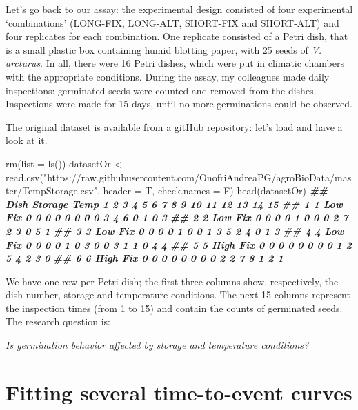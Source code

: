 \documentclass[
]{book}
\newenvironment{Shaded}{\begin{snugshade}}{\end{snugshade}}
\newcommand{\AttributeTok}[1]{\textcolor[rgb]{0.77,0.63,0.00}{#1}}
\newcommand{\DocumentationTok}[1]{\textcolor[rgb]{0.56,0.35,0.01}{\textbf{\textit{#1}}}}
\newcommand{\FunctionTok}[1]{\textcolor[rgb]{0.00,0.00,0.00}{#1}}
\newcommand{\NormalTok}[1]{#1}
\newcommand{\OtherTok}[1]{\textcolor[rgb]{0.56,0.35,0.01}{#1}}
\newcommand{\StringTok}[1]{\textcolor[rgb]{0.31,0.60,0.02}{#1}}
\begin{document}
Let's go back to our assay: the experimental design consisted of four experimental `combinations' (LONG-FIX, LONG-ALT, SHORT-FIX and SHORT-ALT) and four replicates for each combination. One replicate consisted of a Petri dish, that is a small plastic box containing humid blotting paper, with 25 seeds of \emph{V. arcturus}. In all, there were 16 Petri dishes, which were put in climatic chambers with the appropriate conditions. During the assay, my colleagues made daily inspections: germinated seeds were counted and removed from the dishes. Inspections were made for 15 days, until no more germinations could be observed.

The original dataset is available from a gitHub repository: let's load and have a look at it.

\begin{Shaded}
\begin{Highlighting}[]
\FunctionTok{rm}\NormalTok{(}\AttributeTok{list =} \FunctionTok{ls}\NormalTok{())}
\NormalTok{datasetOr }\OtherTok{\textless{}{-}} \FunctionTok{read.csv}\NormalTok{(}\StringTok{"https://raw.githubusercontent.com/OnofriAndreaPG/agroBioData/master/TempStorage.csv"}\NormalTok{, }\AttributeTok{header =}\NormalTok{ T, }\AttributeTok{check.names =}\NormalTok{ F)}
\FunctionTok{head}\NormalTok{(datasetOr)}
\DocumentationTok{\#\#   Dish Storage Temp 1 2 3 4 5 6 7 8 9 10 11 12 13 14 15}
\DocumentationTok{\#\# 1    1     Low  Fix 0 0 0 0 0 0 0 0 3  4  6  0  1  0  3}
\DocumentationTok{\#\# 2    2     Low  Fix 0 0 0 0 1 0 0 0 2  7  2  3  0  5  1}
\DocumentationTok{\#\# 3    3     Low  Fix 0 0 0 0 1 0 0 1 3  5  2  4  0  1  3}
\DocumentationTok{\#\# 4    4     Low  Fix 0 0 0 0 1 0 3 0 0  3  1  1  0  4  4}
\DocumentationTok{\#\# 5    5    High  Fix 0 0 0 0 0 0 0 0 1  2  5  4  2  3  0}
\DocumentationTok{\#\# 6    6    High  Fix 0 0 0 0 0 0 0 0 2  2  7  8  1  2  1}
\end{Highlighting}
\end{Shaded}

We have one row per Petri dish; the first three columns show, respectively, the dish number, storage and temperature conditions. The next 15 columns represent the inspection times (from 1 to 15) and contain the counts of germinated seeds. The research question is:

\emph{Is germination behavior affected by storage and temperature conditions?}

\hypertarget{fitting-several-time-to-event-curves}{%
\section{Fitting several time-to-event curves}\label{fitting-several-time-to-event-curves}}
\end{document}
